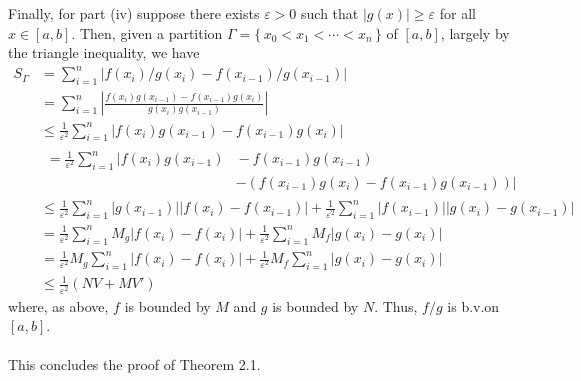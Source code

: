 \begin{solution}
  Finally, for part (iv) suppose there exists \(\varepsilon>0\) such that
  \(|g(x)|\geq\varepsilon\) for all \(x\in[a,b]\). Then, given a partition
  \(\Gamma=\{\,x_0<x_1<\cdots<x_n\,\}\) of \([a,b]\), largely by the
  triangle inequality, we have
  \begin{align*}
    S_\Gamma
    &=\sum_{i=1}^n |f(x_i)/g(x_i)-f(x_{i-1})/g(x_{i-1})|\\
    &=\sum_{i=1}^n\left|\frac{f(x_i)g(x_{i-1})-
      f(x_{i-1})g(x_i)}{g(x_i)g(x_{i-1})}\right|\\
    &\leq\frac{1}{\varepsilon^2}\sum_{i=1}^n|f(x_i)g(x_{i-1})-f(x_{i-1})g(x_i)|\\
    &
      \begin{aligned}
        =\frac{1}{\varepsilon^2}\sum_{i=1}^n |f(x_i)g(x_{i-1}){}&{}-f(x_{i-1})g(x_{i-1})\\
        &-(f(x_{i-1})g(x_i)-f(x_{i-1})g(x_{i-1}))|
      \end{aligned}\\
    &\leq
      \frac{1}{\varepsilon^2}\sum_{i=1}^n|g(x_{i-1})||f(x_i)-f(x_{i-1})|
      +\frac{1}{\varepsilon^2}\sum_{i=1}^n|f(x_{i-1})||g(x_i)-g(x_{i-1})|\\
    &=\frac{1}{\varepsilon^2}\sum_{i=1}^nM_g|f(x_i)-f(x_{i})|
      +\frac{1}{\varepsilon^2}\sum_{i=1}^nM_f|g(x_i)-g(x_i)|\\
    &=\frac{1}{\varepsilon^2}M_g\sum_{i=1}^n|f(x_i)-f(x_{i})|
      +\frac{1}{\varepsilon^2}M_f\sum_{i=1}^n|g(x_i)-g(x_i)|\\
    &\leq\frac{1}{\varepsilon^2}(NV+MV')
  \end{align*}
  where, as above, \(f\) is bounded by \(M\) and \(g\) is bounded by
  \(N\). Thus, \(f/g\) is b.v.\@ on \([a,b]\).
  \\\\
  This concludes the proof of Theorem 2.1.
\end{solution}

